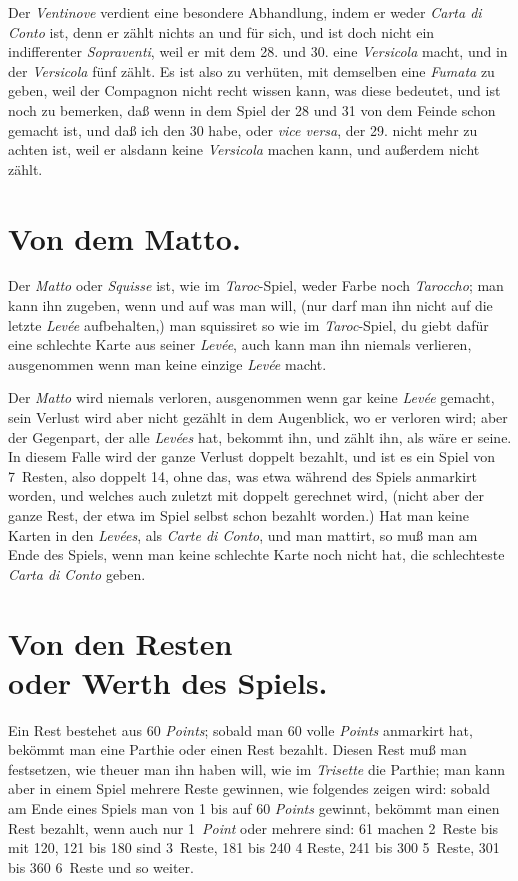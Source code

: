 \documentclass[11pt,a6paper,twoside]{article}
\begin{document}
Der \textit{Ventinove} verdient eine besondere Abhandlung, indem er weder \textit{Carta di Conto} ist, denn er zählt nichts an und für sich, und ist doch nicht ein indifferenter \textit{Sopraventi}, weil er mit dem 28. und 30. eine \textit{Versicola} macht, und in der \textit{Versicola} fünf zählt. Es ist also zu verhüten, mit demselben eine \textit{Fumata} zu geben, weil der Compagnon nicht recht wissen kann, was diese bedeutet, und ist noch zu bemerken, daß wenn in dem Spiel der 28 und 31 von dem Feinde schon gemacht ist, und daß ich den 30 habe, oder \textit{vice versa}, der 29. nicht mehr zu achten ist, weil er alsdann keine \textit{Versicola} machen kann, und außerdem nicht zählt.


\section{Von dem Matto.}

Der \textit{Matto} oder \textit{Squisse} ist, wie im \textit{Taroc}-Spiel, weder Farbe noch \textit{Taroccho}; man kann ihn zugeben, wenn und auf was man will, (nur darf man ihn nicht auf die letzte \textit{Levée} aufbehalten,) man squissiret so wie im \textit{Taroc}-Spiel, du giebt dafür eine schlechte Karte aus seiner \textit{Levée}, auch kann man ihn niemals verlieren, ausgenommen wenn man keine einzige \textit{Levée} macht.

Der \textit{Matto} wird niemals verloren, ausgenommen wenn gar keine \textit{Levée} gemacht, sein Verlust wird aber nicht gezählt in dem Augenblick, wo er verloren wird; aber der Gegenpart, der alle \textit{Levées} hat, bekommt ihn, und zählt ihn, als wäre er seine. In diesem Falle wird der ganze Verlust doppelt bezahlt, und ist es ein Spiel von 7~Resten, also doppelt 14, ohne das, was etwa während des Spiels anmarkirt worden, und welches auch zuletzt mit doppelt gerechnet wird, (nicht aber der ganze Rest, der etwa im Spiel selbst schon bezahlt worden.) Hat man keine Karten in den \textit{Levées}, als \textit{Carte di Conto}, und man mattirt, so muß man am Ende des Spiels, wenn man keine schlechte Karte noch nicht hat, die schlechteste \textit{Carta di Conto} geben.


\section{Von den Resten \\oder Werth des Spiels.}

Ein Rest bestehet aus 60 \textit{Points}; sobald man 60 volle \textit{Points} anmarkirt hat, bekömmt man eine Parthie oder einen Rest bezahlt. Diesen Rest muß man festsetzen, wie theuer man ihn haben will, wie im \textit{Trisette} die Parthie; man kann aber in einem Spiel mehrere Reste gewinnen, wie folgendes zeigen wird: sobald am Ende eines Spiels man von 1 bis auf 60 \textit{Points} gewinnt, bekömmt man einen Rest bezahlt, wenn auch nur 1~\textit{Point} oder mehrere sind: 61 machen 2~Reste bis mit 120, 121 bis 180 sind 3~Reste, 181 bis 240 4 Reste, 241 bis 300 5~Reste, 301 bis 360 6~Reste und so weiter.
\end{document}
